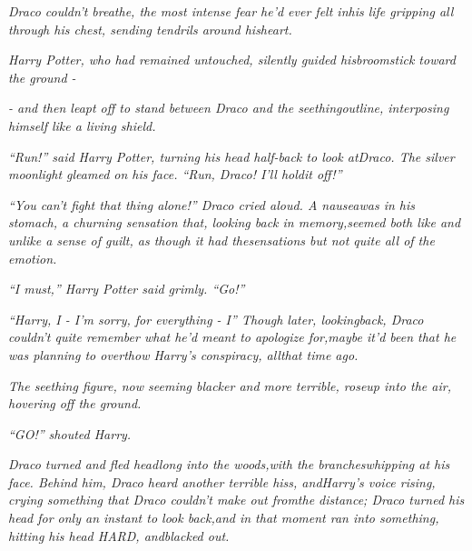 \emph{Draco couldn't breathe, the most intense fear he'd ever felt inhis life gripping all through his chest, sending tendrils around hisheart.}

\emph{Harry Potter, who had remained untouched, silently guided hisbroomstick toward the ground -}

\emph{- and then leapt off to stand between Draco and the seethingoutline, interposing himself like a living shield.}

\emph{``Run!'' said Harry Potter, turning his head half-back to look atDraco. The silver moonlight gleamed on his face. ``Run, Draco! I'll holdit off!''}

\emph{``You can't fight that thing alone!'' Draco cried aloud. A nauseawas in his stomach, a churning sensation that, looking back in memory,seemed both like and unlike a sense of guilt, as though it had thesensations but not quite all of the emotion.}

\emph{``I must,'' Harry Potter said grimly. ``Go!''}

\emph{``Harry, I - I'm sorry, for everything - I'' Though later, lookingback, Draco couldn't quite remember what he'd meant to apologize for,maybe it'd been that he was planning to overthow Harry's conspiracy, allthat time ago.}

\emph{The seething figure, now seeming blacker and more terrible, roseup into the air, hovering off the ground.}

\emph{``GO!'' shouted Harry.}

\emph{Draco turned and fled headlong into the woods,with the brancheswhipping at his face. Behind him, Draco heard another terrible hiss, andHarry's voice rising, crying something that Draco couldn't make out fromthe distance; Draco turned his head for only an instant to look back,and in that moment ran into something, hitting his head HARD, andblacked out.}

